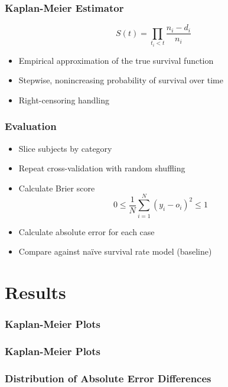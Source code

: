 \documentclass[serif,final,bigger]{beamer}
\begin{document}
  \begin{frame}
    \frametitle{Kaplan-Meier Estimator}
    $$S(t) = \prod_{t_i < t} \frac{n_i - d_i}{n_i}$$
    \begin{itemize}
      \item
        Empirical approximation of the true survival function
      \item
        Stepwise, nonincreasing probability of survival over time
      \item
        Right-censoring handling
    \end{itemize}
  \end{frame}

  \begin{frame}
    \frametitle{Evaluation}
    \begin{itemize}
      \item
        Slice subjects by category
      \item
        Repeat cross-validation with random shuffling
      \item
        Calculate Brier score \cite{brier+score}
        $$0 \leq \frac{1}{N} \sum_{i=1}^N (y_i - o_i)^2 \leq 1$$
      \item
        Calculate absolute error for each case
      \item
        Compare against na{\"i}ve survival rate model (baseline)
    \end{itemize}
  \end{frame}

  \section{Results}


  \begin{frame}
    \frametitle{Kaplan-Meier Plots}
    
  \end{frame}

  \begin{frame}
    \frametitle{Kaplan-Meier Plots}
    
  \end{frame}


  \begin{frame}
    \frametitle{Distribution of Absolute Error Differences}
    \begin{center}
      
    \end{center}
  \end{frame}
\end{document}
